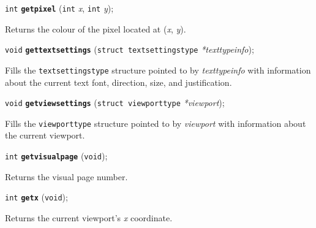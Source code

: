 \documentclass[a4paper,12pt]{article}
\newcommand{\V}{\texttt{void}}      %
\newcommand{\I}{\texttt{int}}       %
\newcommand{\func}[1]{\textbf{\texttt{#1}}}  %
\newcommand{\A}[1]{\emph{#1}}       %
\newenvironment{bgi}
{ %
  \begin{snugshade}
}
{ %
  \end{snugshade}
}
\begin{document}

\label{sec:getpixel}

\begin{bgi}
\I{} \func{getpixel} (\I{} \A{x}, \I{} \A{y});
\end{bgi}

Returns the colour of the pixel located at (\A{x}, \A{y}).


\label{sec:gettextsettings}

\begin{bgi}
\V{} \func{gettextsettings} (\texttt{struct textsettingstype}
\A{*texttypeinfo});
\end{bgi}

Fills the \texttt{textsettingstype} structure pointed to by
\A{texttypeinfo} with information about the current text font,
direction, size, and justification.


\label{sec:getviewsettings}

\begin{bgi}
\V{} \func{getviewsettings} (\texttt{struct viewporttype} \A{*viewport});
\end{bgi}

Fills the \texttt{viewporttype} structure pointed to by \A{viewport}
with information about the current viewport.


\label{sec:getvisualpage}

\begin{bgi}
\I{} \func{getvisualpage} (\V{});
\end{bgi}

Returns the visual page number.


\label{sec:getx}

\begin{bgi}
\I{} \func{getx} (\V{});
\end{bgi}

Returns the current viewport's \A{x} coordinate.


\label{sec:gety}
\end{document}
